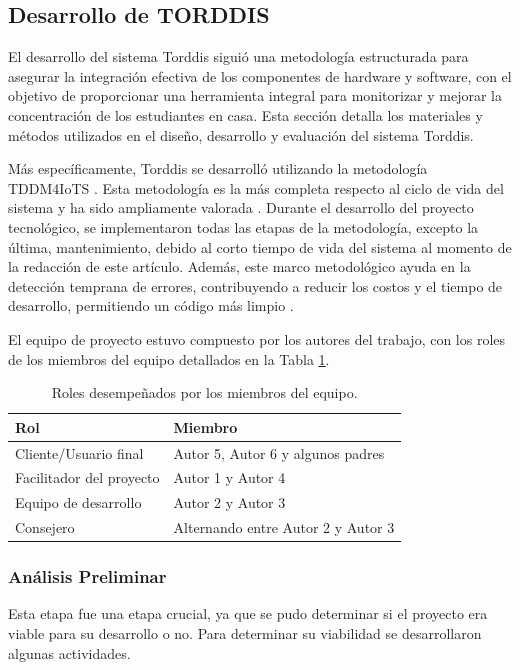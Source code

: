 \documentclass[a4paper,fleqn]{cas-sc}
\begin{document}
		\subsection{Desarrollo de TORDDIS}
			El desarrollo del sistema Torddis siguió una metodología estructurada para asegurar la integración efectiva de los componentes de hardware y software, con el objetivo de proporcionar una herramienta integral para monitorizar y mejorar la concentración de los estudiantes en casa. Esta sección detalla los materiales y métodos utilizados en el diseño, desarrollo y evaluación del sistema Torddis.
			
			Más específicamente, Torddis se desarrolló utilizando la metodología TDDM4IoTS \citep{Guerrero-Ulloa2020TDDM4IoTS}. Esta metodología es la más completa respecto al ciclo de vida del sistema \citep{Guerrero-Ulloa2023Review} y ha sido ampliamente valorada \citep{Guerrero-Ulloa2023DevIdeAir,Guerrero-Ulloa2023IdeAir,Guerrero-Ulloa2023SP4,Guerrero-Ulloa2023Nawi}. Durante el desarrollo del proyecto tecnológico, se implementaron todas las etapas de la metodología, excepto la última, mantenimiento, debido al corto tiempo de vida del sistema al momento de la redacción de este artículo. Además, este marco metodológico ayuda en la detección temprana de errores, contribuyendo a reducir los costos y el tiempo de desarrollo, permitiendo un código más limpio \citep{Beck2002TDD}.
			
			El equipo de proyecto estuvo compuesto por los autores del trabajo, con los roles de los miembros del equipo detallados en la Tabla \ref{tab:Roles}.
			
			\begin{table}[H]
				\caption{Roles desempeñados por los miembros del equipo.\label{tab:Roles}}
				\begin{tabularx}{0.8\textwidth}{>{\arraybackslash}X >{\arraybackslash}X}
					\toprule
					\textbf{Rol}	& \textbf{Miembro}\\
					\midrule
					Cliente/Usuario final & Autor 5, Autor 6 y algunos padres\\
					Facilitador del proyecto		&  Autor 1 y Autor 4\\
					Equipo de desarrollo		&  Autor 2 y Autor 3\\
					Consejero		&  Alternando entre Autor 2 y Autor 3\\
					\bottomrule
				\end{tabularx}
			\end{table}
			
			\subsubsection{Análisis Preliminar}
				Esta etapa fue una etapa crucial, ya que se pudo determinar si el proyecto era viable para su desarrollo o no. Para determinar su viabilidad se desarrollaron algunas actividades.
			
\end{document}
